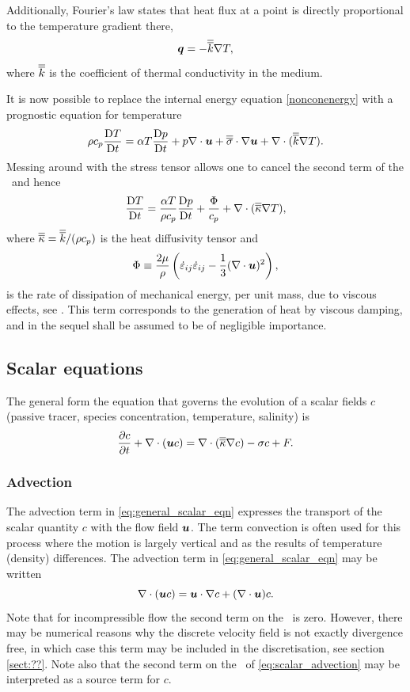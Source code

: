 Additionally, Fourier's law states that heat flux at a point is
directly proportional to the temperature gradient there, \ie
\begin{equation}
{\mbox{\boldmath$q$}} = -\overline{\overline{k}}\nabla T,
\end{equation}
where $\overline{\overline{k}}$ is the coefficient of thermal conductivity in the
medium.

It is now possible to replace the internal energy equation
\eqref{nonconenergy} with a prognostic equation for temperature
\begin{equation}
\rho c_p \frac{\mathrm{D} T}{\mathrm{D} t} =\alpha T\frac{\mathrm{D} p}{\mathrm{D} t} + p\nabla\cdot{\mbox{\boldmath$u$}}
+\overline{\overline{\sigma}}\cdot\nabla{\mbox{\boldmath$u$}} + \nabla\cdot(\overline{\overline{k}}\nabla T).
\end{equation}
Messing around with the stress tensor allows one to cancel the
second term of the \rhs\ and hence
\begin{equation}
\frac{\mathrm{D} T}{\mathrm{D} t} =\frac{\alpha T}{\rho c_p}\frac{\mathrm{D} p}{\mathrm{D} t} +
\frac{\Phi}{c_p} + \nabla\cdot(\overline{\overline{\kappa}}\nabla T),
\end{equation}
where $\overline{\overline{\kappa}} = \overline{\overline{k}}/(\rho c_p)$ is the heat diffusivity tensor
and
\begin{equation}
\Phi \equiv \frac{2\mu}{\rho}\left(\dot{\varepsilon}_{ij}\dot{\varepsilon}_{ij}
-\frac{1}{3}(\nabla\cdot{\mbox{\boldmath$u$}})^2\right),
\end{equation}
is the rate of dissipation of mechanical energy, per unit mass, due
to viscous effects, see \cite[Sections 3.4 and 3.6]{batchelor1967}. This term corresponds
to the generation of heat by viscous damping, and in the sequel shall be assumed to
be of negligible importance.

\subsection{Scalar equations}
The general form the equation that governs the evolution of a scalar fields $c$
(\eg passive tracer, species concentration, temperature, salinity) is
\begin{equation}\label{eq:general_scalar_eqn}
\frac{\partial c}{\partial t} + \nabla\cdot({\mbox{\boldmath$u$}} c) = \nabla\cdot(\overline{\overline{\kappa}}\nabla c) - \sigma c + F.
\end{equation}

\subsubsection{Advection}
The advection term in \eqref{eq:general_scalar_eqn} expresses the transport of 
the scalar quantity $c$ with the flow field ${\mbox{\boldmath$u$}}$. The term convection is often
used for this process where the motion is largely vertical and as the results of
temperature (density) differences.
The advection term in \eqref{eq:general_scalar_eqn} may be written
\begin{equation}\label{eq:scalar_advection}
\nabla\cdot({\mbox{\boldmath$u$}} c) = {\mbox{\boldmath$u$}}\cdot\nabla c + (\nabla\cdot{\mbox{\boldmath$u$}})c.
\end{equation}
Note that for incompressible flow the second term on the \rhs\ is zero. However, there may be numerical
reasons why the discrete velocity field is not exactly divergence free, in which case this term may
be included in the discretisation, see section \ref{sect:??}. Note also that the second term on
the \rhs\ of \eqref{eq:scalar_advection} may be interpreted as a source term for $c$.

